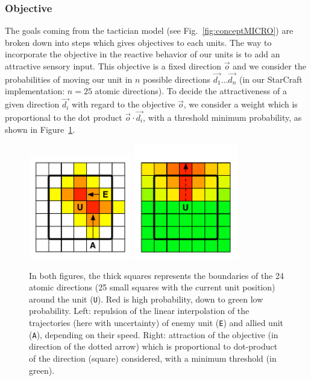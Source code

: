 \subsubsection{Objective}
The goals coming from the tactician model (see Fig.~\ref{fig:conceptMICRO}) are broken down into steps which gives objectives to each units. The way to incorporate the objective in the reactive behavior of our units is to add an attractive sensory input. This objective is a fixed direction $\vec{o}$ and we consider the probabilities of moving our unit in $n$ possible directions $\vec{d_1} \dots \vec{d_n}$ (in our StarCraft implementation: $n=25$ atomic directions). To decide the attractiveness of a given direction $\vec{d_i}$ with regard to the objective $\vec{o}$, we consider a weight which is proportional to the dot product $\vec{o} \cdot \vec{d_i}$, with a threshold minimum probability, as shown in Figure~\ref{fig:BayesianUnit_perceptions}.

\begin{figure}[h]
\begin{center}
\includegraphics[width=4.5cm]{images/repulsion_units_interpolation.pdf}
\hspace{1cm}
\includegraphics[width=4.5cm]{images/obj_Bayesian_units.pdf}
\caption{In both figures, the thick squares represents the boundaries of the 24 atomic directions (25 small squares with the current unit position) around the unit (\texttt{U}). Red is high probability, down to green low probability. Left: repulsion of the linear interpolation of the trajectories (here with uncertainty) of enemy unit (\texttt{E}) and allied unit (\texttt{A}), depending on their speed. Right: attraction of the objective (in direction of the dotted arrow) which is proportional to dot-product of the direction (square) considered, with a minimum threshold (in green).}
\label{fig:BayesianUnit_perceptions}
\end{center}
\end{figure}


